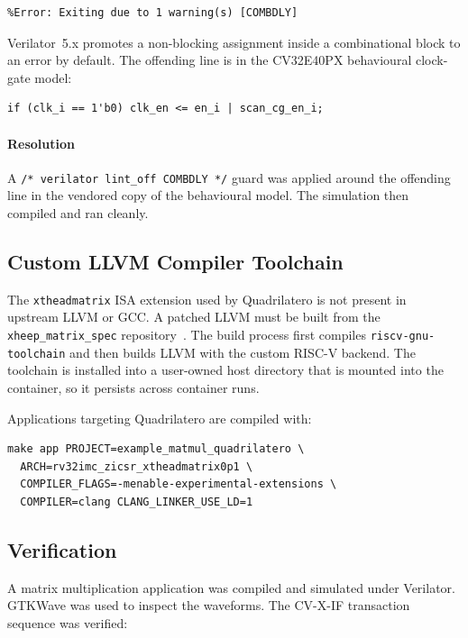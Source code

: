 \documentclass[journal]{IEEEtran}
\begin{document}
\begin{lstlisting}
%Error: Exiting due to 1 warning(s) [COMBDLY]
\end{lstlisting}

Verilator~5.x promotes a non-blocking assignment inside a combinational
block to an error by default. The offending line is in the CV32E40PX
behavioural clock-gate model:

\begin{lstlisting}
if (clk_i == 1'b0) clk_en <= en_i | scan_cg_en_i;
\end{lstlisting}

\paragraph{Resolution} A \texttt{/* verilator lint\_off COMBDLY */} guard
was applied around the offending line in the vendored copy of the behavioural
model. The simulation then compiled and ran cleanly.

\subsection{Custom LLVM Compiler Toolchain}
\label{subsec:toolchain}

The \texttt{xtheadmatrix} ISA extension used by Quadrilatero is not present
in upstream LLVM or GCC. A patched LLVM must be built from the
\texttt{xheep\_matrix\_spec} repository~\cite{xheep_matrix_spec}. The build
process first compiles \texttt{riscv-gnu-toolchain} and
then builds LLVM with the custom RISC-V backend. The toolchain is installed
into a user-owned host directory that is mounted into the container, so it
persists across container runs.

Applications targeting Quadrilatero are compiled with:

\begin{lstlisting}
make app PROJECT=example_matmul_quadrilatero \
  ARCH=rv32imc_zicsr_xtheadmatrix0p1 \
  COMPILER_FLAGS=-menable-experimental-extensions \
  COMPILER=clang CLANG_LINKER_USE_LD=1
\end{lstlisting}

\subsection{Verification}
\label{subsec:ifverify}

A matrix multiplication application was compiled and simulated under
Verilator. GTKWave was used to inspect the waveforms. The CV-X-IF
transaction sequence was verified:
\end{document}
